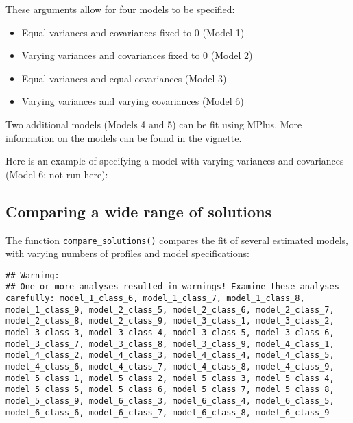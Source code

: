 \documentclass[man]{apa6}
\providecommand{\tightlist}{%
  \setlength{\itemsep}{0pt}\setlength{\parskip}{0pt}}
\begin{document}
These arguments allow for four models to be specified:

\begin{itemize}
\tightlist
\item
  Equal variances and covariances fixed to 0 (Model 1)
\item
  Varying variances and covariances fixed to 0 (Model 2)
\item
  Equal variances and equal covariances (Model 3)
\item
  Varying variances and varying covariances (Model 6)
\end{itemize}

Two additional models (Models 4 and 5) can be fit using MPlus. More information
on the models can be found in the
\href{https://data-edu.github.io/tidyLPA/articles/Introduction_to_tidyLPA.html}{vignette}.

Here is an example of specifying a model with varying variances and covariances
(Model 6; not run here):

\hypertarget{comparing-a-wide-range-of-solutions}{%
\subsection{Comparing a wide range of solutions}\label{comparing-a-wide-range-of-solutions}}

The function \texttt{compare\_solutions()} compares the fit of several estimated models,
with varying numbers of profiles and model specifications:

\begin{verbatim}
## Warning: 
## One or more analyses resulted in warnings! Examine these analyses carefully: model_1_class_6, model_1_class_7, model_1_class_8, model_1_class_9, model_2_class_5, model_2_class_6, model_2_class_7, model_2_class_8, model_2_class_9, model_3_class_1, model_3_class_2, model_3_class_3, model_3_class_4, model_3_class_5, model_3_class_6, model_3_class_7, model_3_class_8, model_3_class_9, model_4_class_1, model_4_class_2, model_4_class_3, model_4_class_4, model_4_class_5, model_4_class_6, model_4_class_7, model_4_class_8, model_4_class_9, model_5_class_1, model_5_class_2, model_5_class_3, model_5_class_4, model_5_class_5, model_5_class_6, model_5_class_7, model_5_class_8, model_5_class_9, model_6_class_3, model_6_class_4, model_6_class_5, model_6_class_6, model_6_class_7, model_6_class_8, model_6_class_9
\end{verbatim}
\end{document}

